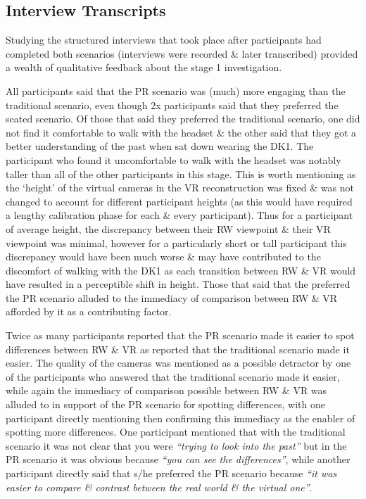 \subsection{Interview Transcripts}

Studying the structured interviews that took place after participants had completed both scenarios (interviews were recorded \& later transcribed) provided a wealth of qualitative feedback about the stage 1 investigation.

All participants said that the PR scenario was (much) more engaging than the traditional scenario, even though 2x participants said that they preferred the seated scenario. Of those that said they preferred the traditional scenario, one did not find it comfortable to walk with the headset \& the other said that they got a better understanding of the past when sat down wearing the DK1. The participant who found it uncomfortable to walk with the headset was notably taller than all of the other participants in this stage. This is worth mentioning as the `height' of the virtual cameras in the VR reconstruction was fixed \& was not changed to account for different participant heights (as this would have required a lengthy calibration phase for each \& every participant). Thus for a participant of average height, the discrepancy between their RW viewpoint \& their VR viewpoint was minimal, however for a particularly short or tall participant this discrepancy would have been much worse \& may have contributed to the discomfort of walking with the DK1 as each transition between RW \& VR would have resulted in a perceptible shift in height. Those that said that the preferred the PR scenario alluded to the immediacy of comparison between RW \& VR afforded by it as a contributing factor.

Twice as many participants reported that the PR scenario made it easier to spot differences between RW \& VR as reported that the traditional scenario made it easier. The quality of the cameras was mentioned as a possible detractor by one of the participants who answered that the traditional scenario made it easier, while again the immediacy of comparison possible between RW \& VR was alluded to in support of the PR scenario for spotting differences, with one participant directly mentioning then confirming this immediacy as the enabler of spotting more differences. One participant mentioned that with the traditional scenario it was not clear that you were \textit{``trying to look into the past''} but in the PR scenario it was obvious because \textit{``you can see the differences''}, while another participant directly said that s/he preferred the PR scenario because \textit{``it was easier to compare \& contrast between the real world \& the virtual one''}.

